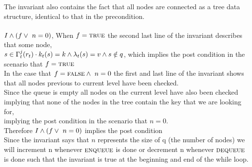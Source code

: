 \documentclass[headings=small,a4paper,12pt]{scrartcl}
\newcommand{\enq}{\textsc{enqueue}\xspace}
\newcommand{\deq}{\textsc{dequeue}\xspace}
\begin{document}
The invariant also contains the fact that all nodes are connected as a tree data structure, identical to that in the precondition.\\
\\
$I\wedge(f\vee~n=0)$, When $f=\text{\textsc{true}}$ the second last line of the invariant describes that some node,\\ $s\in\Gamma^j_t(r_t)\cdot{}k_t(s) = k\wedge \lambda_t(s) = v\wedge s\notin q$, which implies the post condition in the scenario that $f = \text{\textsc{true}}$\\
In the case that $f=\text{\textsc{false}}\wedge~n=0$ the first and last line of the invariant shows that all nodes previous to current level have been checked.\\ Since the queue is empty all nodes on the current level have also been checked implying that none of the nodes in the tree contain the key that we are looking for,\\ implying the post condition in the scenario that $n=0$.\\
Therefore $I\wedge(f\vee~n=0)$ implies the post condition\\
Since the invariant says that $n$ represents the size of q (the number of nodes) we will increment n whenever $\enq$ is done or decrement n whenever $\deq$ is done such that the invariant is true at the beginning and end of the while loop.
\break
\end{document}
